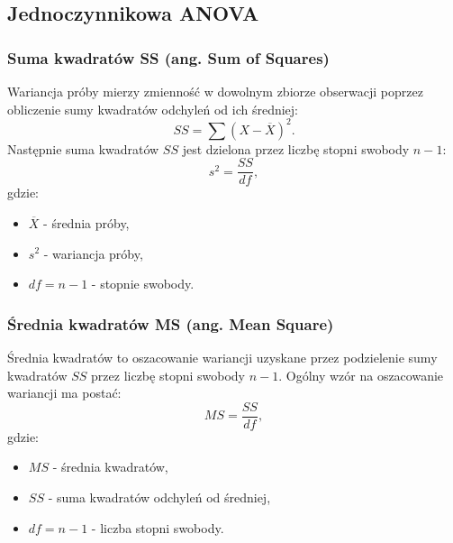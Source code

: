 \documentclass[12pt,a4paper]{article}
\begin{document}
\newpage
\subsection{Jednoczynnikowa ANOVA}

\subsubsection{Suma kwadratów SS (ang. Sum of Squares)}
Wariancja próby mierzy zmienność w dowolnym zbiorze obserwacji poprzez obliczenie sumy kwadratów odchyleń od ich średniej:
$$SS=\sum(X-\overline{X})^2.$$
Następnie suma kwadratów $SS$ jest dzielona przez liczbę stopni swobody $n-1$:
$$s^2=\frac{SS}{df},$$
gdzie:
\begin{itemize}
    \item $\overline{X}$ - średnia próby,
    \item $s^2$ - wariancja próby,
    \item $df=n-1$ - stopnie swobody.
\end{itemize}

\subsubsection{Średnia kwadratów MS (ang. Mean Square)}
Średnia kwadratów to oszacowanie wariancji uzyskane przez podzielenie sumy kwadratów $SS$ przez liczbę stopni swobody $n-1$.
Ogólny wzór na oszacowanie wariancji ma postać:
$$MS=\frac{SS}{df},$$
gdzie:
\begin{itemize}
    \item $MS$ - średnia kwadratów,
    \item $SS$ - suma kwadratów odchyleń od średniej,
    \item $df = n-1$ - liczba stopni swobody.
\end{itemize}

\newpage
\end{document}
